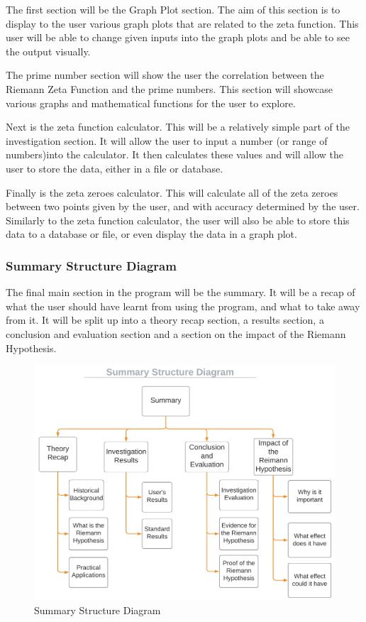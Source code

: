 \documentclass{article}
\begin{document}
The first section will be the Graph Plot section. The aim of this section is to display to the user various graph plots that are related to the zeta function. This user will be able to change given inputs into the graph plots and be able to see the output visually.

The prime number section will show the user the correlation between the Riemann Zeta Function and the prime numbers. This section will showcase various graphs and mathematical functions for the user to explore.

Next is the zeta function calculator. This will be a relatively simple part of the investigation section. It will allow the user to input a number (or range of numbers)into the calculator. It then calculates these values and will allow the user to store the data, either in a file or database.

Finally is the zeta zeroes calculator. This will calculate all of the zeta zeroes between two points given by the user, and with accuracy determined by the user. Similarly to the zeta function calculator, the user will also be able to store this data to a database or file, or even display the data in a graph plot.


\subsubsection{Summary Structure Diagram}

The final main section in the program will be the summary. It will be a recap of what the user should have learnt from using the program, and what to take away from it. It will be split up into a theory recap section, a results section, a conclusion and evaluation section and a section on the impact of the Riemann Hypothesis.


\begin{figure}[h]
    \centering
    \captionsetup{justification=centering}
    \includegraphics[scale=0.5]{summary-structure-diagram}
    \caption{Summary Structure Diagram}
\end{figure}
\end{document}
